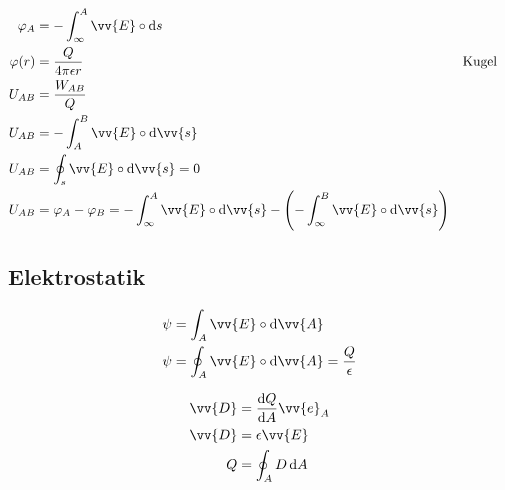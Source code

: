 \begin{boxleft}
\\
\end{boxleft}\begin{boxrightshaded}
\begin{align*}
\varphi_A&=-\int_\infty^A\vv{E}\circ\diff s\\
\varphi(r)&=\frac{Q}{4\pi \epsilon r}&&\text{Kugel}\\
U_{AB}&=\frac{W_{AB}}{Q}\\
U_{AB}&=-\int_A^B\vv{E}\circ\diff\vv{s}\\
U_{AB}&=\oint_s\vv{E}\circ\diff\vv{s}=0\\
U_{AB}&=\varphi_A-\varphi_B=-\int_\infty^A\vv{E}\circ\diff\vv{s}-\left(-\int_\infty^B\vv{E}\circ\diff\vv{s}\right)
\end{align*}
\end{boxrightshaded}

\subsection{Elektrostatik}

\begin{boxleft}
\end{boxleft}\begin{boxrightshaded}
\begin{align*}
\psi&=\int_A\vv{E}\circ\diff\vv{A}\\
\psi&=\oint_A\vv{E}\circ\diff\vv{A}=\frac{Q}{\epsilon}\\
\end{align*}
\end{boxrightshaded}

\begin{boxleft}
\end{boxleft}\begin{boxrightshaded}
\begin{align*}
\vv{D}&=\frac{\diff Q}{\diff A}\vv{e}_A\\
\vv{D}&=\epsilon\vv{E}\\
Q&=\oint_AD\diff A
\end{align*}
\end{boxrightshaded}


